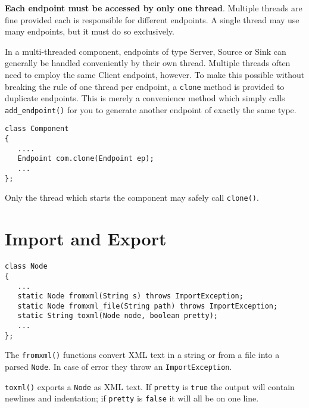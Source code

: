 \documentclass[12pt,a4paper,twoside]{article}
\renewcommand{\_}{\texttt{\symbol{95}}}
\begin{document}
\textbf{Each endpoint must be accessed by only one thread}. Multiple threads
are fine provided each is responsible for different endpoints.
A single thread may use many endpoints, but it must do so exclusively.

In a multi-threaded component, endpoints of type Server, Source or Sink
can generally be handled conveniently by their own thread. Multiple
threads often need to employ the same Client endpoint, however.
To make this possible without breaking the rule of one thread per
endpoint, a \verb^clone^ method is provided to duplicate endpoints.
This is merely a convenience method which simply calls
\verb^add_endpoint()^ for you to generate another endpoint of exactly
the same type.

\begin{verbatim}
class Component
{
   ....
   Endpoint com.clone(Endpoint ep);
   ...
};
\end{verbatim}

Only the thread which starts the component may safely call \verb^clone()^.

\section{Import and Export}

\begin{verbatim}
class Node
{
   ...
   static Node fromxml(String s) throws ImportException;
   static Node fromxml_file(String path) throws ImportException;
   static String toxml(Node node, boolean pretty);
   ...
};

\end{verbatim}

The \verb^fromxml()^ functions convert XML text in a string or from a file
into a parsed \verb^Node^. In case of error they throw an
\verb^ImportException^.

\verb^toxml()^ exports a \verb^Node^ as XML text. If \verb^pretty^ is
\verb^true^ the output will contain newlines and indentation; if
\verb^pretty^ is \verb^false^ it will all be on one line.
\end{document}
